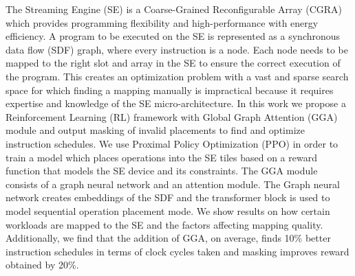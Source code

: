 The Streaming Engine (SE) is a Coarse-Grained Reconfigurable Array (CGRA) which provides programming flexibility and high-performance with energy efficiency.
A program to be executed on the SE is represented as a synchronous data flow (SDF) graph, where every instruction is a node.
Each node needs to be mapped to the right slot and array in the SE to ensure the correct execution of the program.
This creates an optimization problem with a vast and sparse search space for which finding a mapping manually is impractical because it requires expertise and knowledge of the SE micro-architecture.
In this work we propose a Reinforcement Learning (RL) framework with Global Graph Attention (GGA) module and output masking of invalid placements to find and optimize instruction schedules.
We use Proximal Policy Optimization (PPO) in order to train a model which places operations into the SE tiles based on a reward function that models the SE device and its constraints.
The GGA module consists of a graph neural network and an attention module. 
The Graph neural network creates embeddings of the SDF and the transformer block is used to model sequential operation placement mode. 
We show results on how certain workloads are mapped to the SE and the factors affecting mapping quality.
Additionally, we find that the addition of GGA, on average, finds 10\% better instruction schedules in terms of clock cycles taken and masking improves reward obtained by 20\%.
